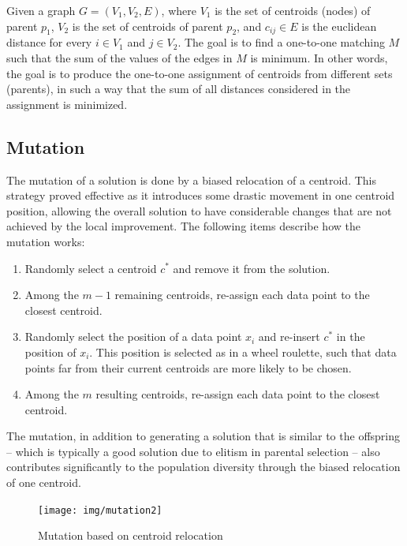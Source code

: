 
Given a graph $G = (V_1, V_2, E)$, where $V_1$ is the set of centroids (nodes) of parent $p_1$, $V_2$ is the set of centroids of parent $p_2$, and $c_{ij} \in E$ is the euclidean distance for every $i \in V_1$ and $j \in V_2$. The goal is to find a one-to-one matching $M$ such that the sum of the values of the edges in $M$ is minimum. In other words, the goal is to produce the one-to-one assignment of centroids from different sets (parents), in such a way that the sum of all distances considered in the assignment is minimized.

\subsection{Mutation}
The mutation of a solution is done by a biased relocation of a centroid. This strategy proved effective as it introduces some drastic movement in one centroid position, allowing the overall solution to have considerable changes that are not achieved by the local improvement. The following items describe how the mutation works:

\begin{enumerate}

	\item Randomly select a centroid $c^{*}$ and remove it from the solution.
	
	\item Among the $m-1$ remaining centroids, re-assign each data point to the closest centroid.
	
	\item Randomly select the position of a data point $x_i$ and re-insert $c^{*}$ in the position of $x_i$. This position is selected as in a wheel roulette, such that data points far from their current centroids are more likely to be chosen.
	
	\item Among the $m$ resulting centroids, re-assign each data point to the closest centroid.
		
\end{enumerate}

The mutation, in addition to generating a solution that is similar to the offspring -- which is typically a good solution due to elitism in parental selection -- also contributes significantly to the population diversity through the biased relocation of one centroid.

\begin{figure}[H]
  \begin{center}
    \texttt{[image: img/mutation2]}
    \caption{Mutation based on centroid relocation}\label{fig:mutation}
  \end{center}
\end{figure}

